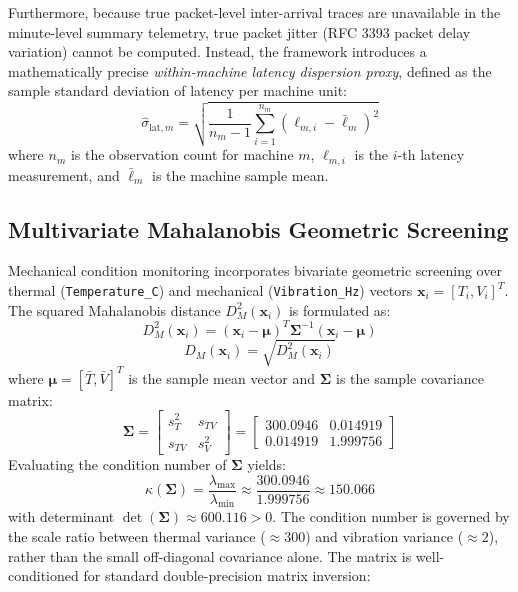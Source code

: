 \documentclass[journal]{IEEEtran}
\begin{document}
Furthermore, because true packet-level inter-arrival traces are unavailable in the minute-level summary telemetry, true packet jitter (RFC 3393 packet delay variation) cannot be computed. Instead, the framework introduces a mathematically precise \textit{within-machine latency dispersion proxy}, defined as the sample standard deviation of latency per machine unit:
\begin{equation}
\hat{\sigma}_{\text{lat}, m} = \sqrt{\frac{1}{n_m - 1} \sum_{i=1}^{n_m} \left( \ell_{m, i} - \bar{\ell}_m \right)^2}
\end{equation}
where $n_m$ is the observation count for machine $m$, $\ell_{m, i}$ is the $i$-th latency measurement, and $\bar{\ell}_m$ is the machine sample mean.

\subsection{Multivariate Mahalanobis Geometric Screening}
Mechanical condition monitoring incorporates bivariate geometric screening over thermal (\texttt{Temperature\_C}) and mechanical (\texttt{Vibration\_Hz}) vectors $\mathbf{x}_i = [T_i, V_i]^T$. The squared Mahalanobis distance $D_M^2(\mathbf{x}_i)$ is formulated as:
\begin{equation}
D_M^2(\mathbf{x}_i) = (\mathbf{x}_i - \boldsymbol{\mu})^T \mathbf{\Sigma}^{-1} (\mathbf{x}_i - \boldsymbol{\mu})
\end{equation}
\begin{equation}
D_M(\mathbf{x}_i) = \sqrt{D_M^2(\mathbf{x}_i)}
\end{equation}
where $\boldsymbol{\mu} = [\bar{T}, \bar{V}]^T$ is the sample mean vector and $\mathbf{\Sigma}$ is the sample covariance matrix:
\begin{equation}
\mathbf{\Sigma} = \begin{bmatrix} s_T^2 & s_{TV} \\ s_{TV} & s_V^2 \end{bmatrix} = \begin{bmatrix} 300.0946 & 0.014919 \\ 0.014919 & 1.999756 \end{bmatrix}
\end{equation}
Evaluating the condition number of $\mathbf{\Sigma}$ yields:
\begin{equation}
\kappa(\mathbf{\Sigma}) = \frac{\lambda_{\max}}{\lambda_{\min}} \approx \frac{300.0946}{1.999756} \approx 150.066
\end{equation}
with determinant $\det(\mathbf{\Sigma}) \approx 600.116 > 0$. The condition number is governed by the scale ratio between thermal variance ($\approx 300$) and vibration variance ($\approx 2$), rather than the small off-diagonal covariance alone. The matrix is well-conditioned for standard double-precision matrix inversion:
\end{document}
